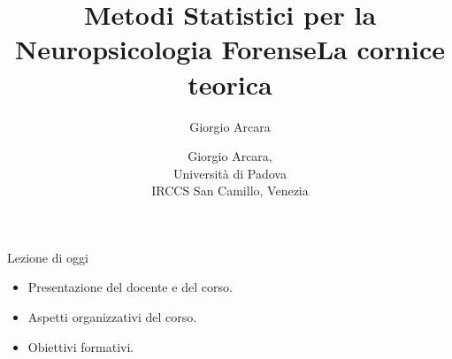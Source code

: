 \documentclass[
  ignorenonframetext,
]{beamer}
\author{Giorgio Arcara}
\date{}
\providecommand{\tightlist}{%
  \setlength{\itemsep}{0pt}\setlength{\parskip}{0pt}}
\begin{document}
\begin{frame}
\title{Metodi Statistici per la Neuropsicologia Forense}
\author{Giorgio Arcara,\\ Università di Padova \\ IRCCS San Camillo, Venezia}

\maketitle

\title{La cornice teorica}

\maketitle
\end{frame}

\begin{frame}{Lezione di oggi}
\label{lezione-di-oggi}
\begin{itemize}[<+->]
\tightlist
\item
  Presentazione del docente e del corso.
\item
  Aspetti organizzativi del corso.
\item
  Obiettivi formativi.
\end{itemize}
\end{frame}
\end{document}
